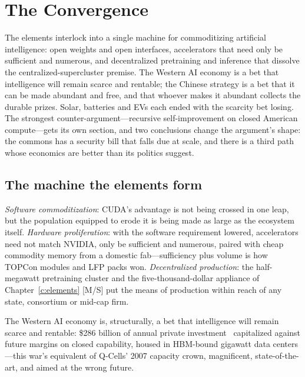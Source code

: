 \chapter{The Convergence}
\label{c:convergence}

\begin{glance}
The elements interlock into a single machine for commoditizing artificial intelligence: open weights and open interfaces, accelerators that need only be sufficient and numerous, and decentralized pretraining and inference that dissolve the centralized-supercluster premise. The Western AI economy is a bet that intelligence will remain scarce and rentable; the Chinese strategy is a bet that it can be made abundant and free, and that whoever makes it abundant collects the durable prizes. Solar, batteries and EVs each ended with the scarcity bet losing. The strongest counter-argument---recursive self-improvement on closed American compute---gets its own section, and two conclusions change the argument's shape: the commons has a security bill that falls due at scale, and there is a third path whose economics are better than its politics suggest. 
\end{glance}

\section{The machine the elements form}

\emph{Software commoditization}: CUDA's advantage is not being crossed in one leap, but the population equipped to erode it is being made as large as the ecosystem itself. \emph{Hardware proliferation}: with the software requirement lowered, accelerators need not match NVIDIA, only be sufficient and numerous, paired with cheap commodity memory from a domestic fab---sufficiency plus volume is how TOPCon modules and LFP packs won. \emph{Decentralized production}: the half-megawatt pretraining cluster and the five-thousand-dollar appliance of Chapter~\ref{c:elements} [M/S] put the means of production within reach of any state, consortium or mid-cap firm.

The Western AI economy is, structurally, a bet that intelligence will remain scarce and rentable: \$286 billion of annual private investment~\cite{stanford-aiindex-2026} capitalized against future margins on closed capability, housed in HBM-bound gigawatt data centers---this war's equivalent of Q-Cells' 2007 capacity crown, magnificent, state-of-the-art, and aimed at the wrong future.

